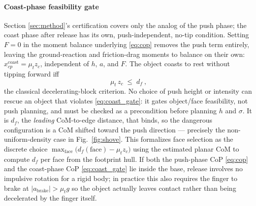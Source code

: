 \documentclass[10pt, conference]{IEEEtran}
\begin{document}
\paragraph{Coast-phase feasibility gate}
Section \ref{sec:method}'s certification covers only the analog of the push phase; the coast phase after release has its own, push-independent, no-tip condition. Setting $F=0$ in the moment balance underlying \eqref{eq:cop} removes the push term entirely, leaving the ground-reaction and friction-drag moments to balance on their own: $x_{cp}^{\mathrm{coast}} = \mu_t z_c$, independent of $h$, $a$, and $F$. The object coasts to rest without tipping forward iff
\begin{equation}
    \boxed{\ \mu_t\, z_c \;\le\; d_f\ }, \label{eq:coast_gate}
\end{equation}
the classical decelerating-block criterion. No choice of push height or intensity can rescue an object that violates \eqref{eq:coast_gate}: it gates object/face feasibility, not push planning, and must be checked as a precondition before planning $h$ and $\sigma$. It is $d_f$, the \emph{leading} CoM-to-edge distance, that binds, so the dangerous configuration is a CoM shifted toward the push direction --- precisely the non-uniform-density case in Fig.~\ref{fig:shove}. This formalizes face selection as the discrete choice $\max_{\text{face}}\big(d_f(\text{face}) - \mu_t z_c\big)$ using the estimated planar CoM to compute $d_f$ per face from the footprint hull. If both the push-phase CoP \eqref{eq:cop} and the coast-phase CoP \eqref{eq:coast_gate} lie inside the base, release involves no impulsive rotation for a rigid body; in practice this also requires the finger to brake at $|a_{\mathrm{brake}}| > \mu_t g$ so the object actually leaves contact rather than being decelerated by the finger itself.
\end{document}
